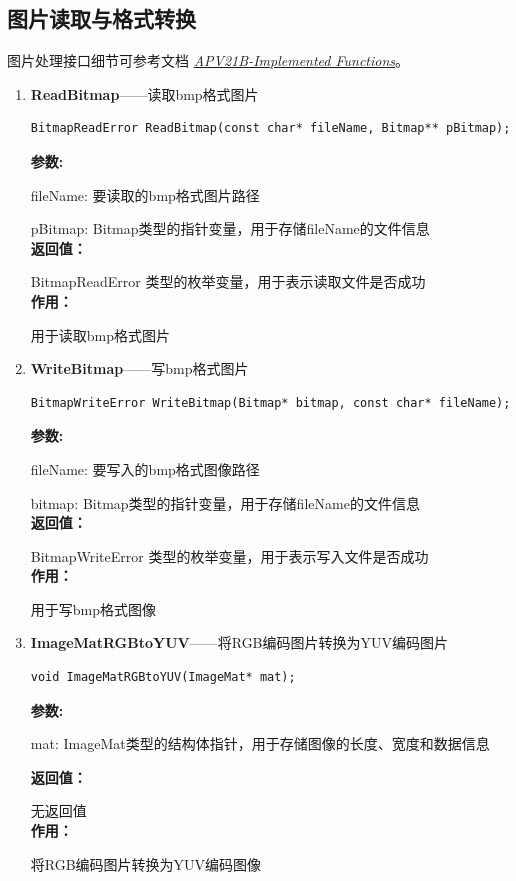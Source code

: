 \documentclass[12pt, a4paper, oneside]{ctexbook}
\begin{document}
	
		\subsection{图片读取与格式转换}
		图片处理接口细节可参考文档 \href{./ref/APV21B_Implemented_Functions.pdf}{\textit{APV21B-Implemented Functions}}。
		\begin{enumerate}
			\item \textbf{ReadBitmap}——读取bmp格式图片
				\begin{lstlisting}[numbers=none]
BitmapReadError ReadBitmap(const char* fileName, Bitmap** pBitmap);
				\end{lstlisting}
				\textbf{参数:} \par fileName: 要读取的bmp格式图片路径 \par pBitmap: Bitmap类型的指针变量，用于存储fileName的文件信息 \\
				\textbf{返回值：}\par BitmapReadError 类型的枚举变量，用于表示读取文件是否成功\\
				\textbf{作用：}\par 用于读取bmp格式图片\\
			
			\item \textbf{WriteBitmap}——写bmp格式图片
				\begin{lstlisting}[numbers=none]
BitmapWriteError WriteBitmap(Bitmap* bitmap, const char* fileName);
				\end{lstlisting}
				\textbf{参数:} \par fileName: 要写入的bmp格式图像路径 \par bitmap: Bitmap类型的指针变量，用于存储fileName的文件信息 \\
				\textbf{返回值：}\par BitmapWriteError 类型的枚举变量，用于表示写入文件是否成功\\
				\textbf{作用：}\par 用于写bmp格式图像\\
			
			\item \textbf{ImageMatRGBtoYUV}——将RGB编码图片转换为YUV编码图片
				\begin{lstlisting}[numbers=none]
void ImageMatRGBtoYUV(ImageMat* mat);
				\end{lstlisting}
				\textbf{参数:} \par mat: ImageMat类型的结构体指针，用于存储图像的长度、宽度和数据信息\par 
				\textbf{返回值：}\par 无返回值 \\
				\textbf{作用：}\par  将RGB编码图片转换为YUV编码图像\\


\end{enumerate}
\end{document}
